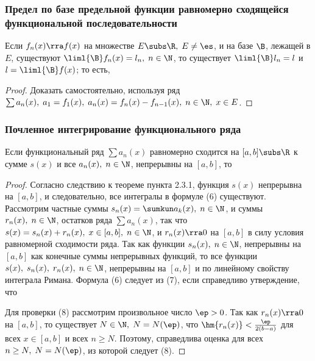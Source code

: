 \documentclass[a4paper]{article}
\begin{document}
\subsubsection{Предел по базе предельной функции равномерно
сходящейся функциональной последовательности}

\begin{theorem}
Если $f_n(x)\rra f(x)$ на множестве $E\subs\R, \; E\ne\es$, и на
базе $\B$, лежащей в $E$, существуют $\liml{\B}f_n(x) = l_n, \;
n\in\N$, то существует $\liml{\B}l_n=l$ и $l=\liml{\B} f(x)$; то
есть, 
\end{theorem}

\begin{proof}
Доказать самостоятельно, используя ряд $\sum a_n(x), \; a_1=f_1(x),
\; a_n(x) = f_n(x) - f_{n-1}(x), \; n\in\N, \; x\in E$.
\end{proof}

\subsubsection{Почленное интегрирование функционального ряда}
\begin{theorem}
Если функциональный ряд $\sum a_n(x)$ равномерно сходится на
$[a,b]\subs\R$ к сумме $s(x)$ и все $a_n(x), \; n\in\N$, непрерывны
на $[a,b]$, то 
\end{theorem}

\begin{proof}
Согласно следствию к теореме пункта 2.3.1, функция $s(x)$ непрерывна
на $[a,b]$, и следовательно, все интегралы в формуле (6) существуют.
Рассмотрим частные суммы $s_n(x) = \sumkun a_k(x), \; n\in\N$, и
суммы $r_n(x), \; n\in\N$, остатков ряда $\sum a_n(x)$, так что
$s(x) = s_n(x)+r_n(x), \; x\in[a,b], \; n\in\N$, и $r_n(x)\rra0$ на
$[a,b]$ в силу условия равномерной сходимости ряда. Так как функции
$s_n(x), \; n\in\N$, непрерывны на $[a,b]$ как конечные суммы
непрерывных функций, то все функции $s(x), \; s_n(x), \; r_n(x), \;
n\in\N$, непрерывны на $[a,b]$ и  по линейному свойству
интеграла Римана. Формула (6) следует из (7), если справедливо
утверждение, что 

Для проверки (8) рассмотрим произвольное число $\ep>0$. Так как
$r_n(x)\rra0$ на $[a,b]$, то существует $N\in\N, \; N=N(\ep)$, что
$\hm{r_n(x)} < \frac{\ep}{2(b-a)}$ для всех $x\in[a,b]$ и всех $n\ge
N$. Поэтому, справедлива оценка  для всех
$n\ge N, \; N=N(\ep)$, из которой следует (8).
\end{proof}
\end{document}
